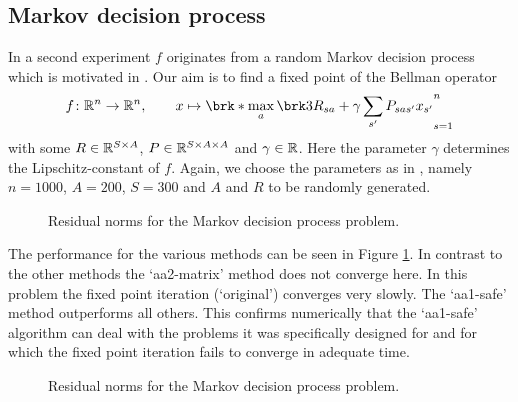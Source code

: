 %	
%

\subsection{Markov decision process}

In a second experiment $f$ originates from a random Markov decision process which is motivated in \cite[Section 5.1f]{ZhaAA}. Our aim is to find a fixed point of the Bellman operator
\begin{align*}
	f\colon\R^{n}\to\R^{n}, \qquad x\mapsto \brk*{\max_{a} \brk3{ R_{sa}+\gamma \sum_{s'}P_{sas'}x_{s'}}}_{s=1}^{n}
\end{align*}
with some $R\in\mathbb{R}^{S\times A}$, $P\in\mathbb{R}^{S\times A\times A}$ and $\gamma\in\mathbb{R}$. Here the parameter $\gamma$ determines the Lipschitz-constant of $f$. Again, we choose the parameters as in \cite[Section 5.2]{ZhaAA}, namely $n=1000$, $A=200$, $S=300$ and $A$ and $R$ to be randomly generated.

\begin{figure}
	\centering
	{\scriptsize
	
	}
	\caption{Residual norms for the Markov decision process problem.}
	\label{pl:method_comparison_VI}
\end{figure}

The performance for the various methods can be seen in Figure \ref{pl:method_comparison_VI}. In contrast to the other methods the `aa2-matrix' method does not converge here. In this problem the fixed point iteration (`original') converges very slowly. The `aa1-safe' method outperforms all others. This confirms numerically that the `aa1-safe' algorithm can deal with the problems it was specifically designed for and for which the fixed point iteration fails to converge in adequate time. 

\begin{figure}
	\centering
	{\scriptsize
	
	}
	\caption{Residual norms for the Markov decision process problem.}
	\label{pl:memory_comparison_VI}
\end{figure}

